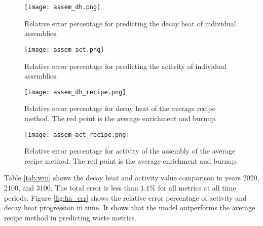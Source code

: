 \begin{figure}
    \centering
    \texttt{[image: assem\_dh.png]}
    \caption{Relative error percentage for predicting the decay
             heat of individual assemblies.}
    \label{fig:assem_dh}
\end{figure}


\begin{figure}
    \centering
    \texttt{[image: assem\_act.png]}
    \caption{Relative error percentage for predicting the
             activity of individual assemblies.}
    \label{fig:assem_act}
\end{figure}


\begin{figure}
    \centering
    \texttt{[image: assem\_dh\_recipe.png]}
    \caption{Relative error percentage for decay heat
             of the average recipe
             method. The red point is the average enrichment and
             burnup.}
    \label{fig:assem_dh_recipe}
\end{figure}

\begin{figure}
    \centering
    \texttt{[image: assem\_act\_recipe.png]}
    \caption{Relative error percentage for activity
             of the assembly of the average recipe
             method. The red point is the average enrichment and
             burnup.}
    \label{fig:assem_act_recipe}
\end{figure}

\FloatBarrier


Table \ref{tab:wm} shows the decay heat and activity value
comparison in years 2020, 2100, and 3100. The total
error is less than 1.1\% for all metrics at all time periods.
Figure \ref{fig:ha_err} shows the relative error percentage
of activity and decay heat progression in time. It shows
that the model outperforms the average recipe method
in predicting waste metrics.


